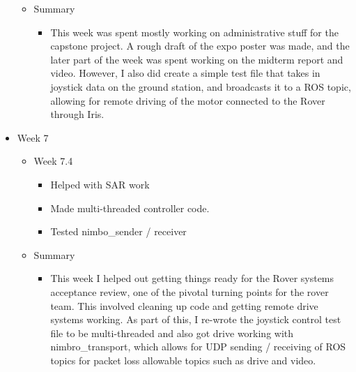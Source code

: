 \begin{itemize}
\begin{itemize}
    \item Summary
      \begin{itemize}
      \item This week was spent mostly working on administrative stuff for the capstone project. A rough draft of the expo poster was made, and the later part of the week was spent working on the midterm report and video. However, I also did create a simple test file that takes in joystick data on the ground station, and broadcasts it to a ROS topic, allowing for remote driving of the motor connected to the Rover through Iris. 
      \end{itemize}
	\end{itemize}

\item Week 7
	\begin{itemize}
	\item Week 7.4
      \begin{itemize}
      \item Helped with SAR work 
      \item Made multi-threaded controller code. 
      \item Tested nimbo\_sender / receiver 
      \end{itemize}
    
    \item Summary
      \begin{itemize}
      \item This week I helped out getting things ready for the Rover systems acceptance review, one of the pivotal turning points for the rover team. This involved cleaning up code and getting remote drive systems working. As part of this, I re-wrote the joystick control test file to be multi-threaded and also got drive working with nimbro\_transport, which allows for UDP sending / receiving of ROS topics for packet loss allowable topics such as drive and video. 
      \end{itemize}
	\end{itemize}


\end{itemize}
